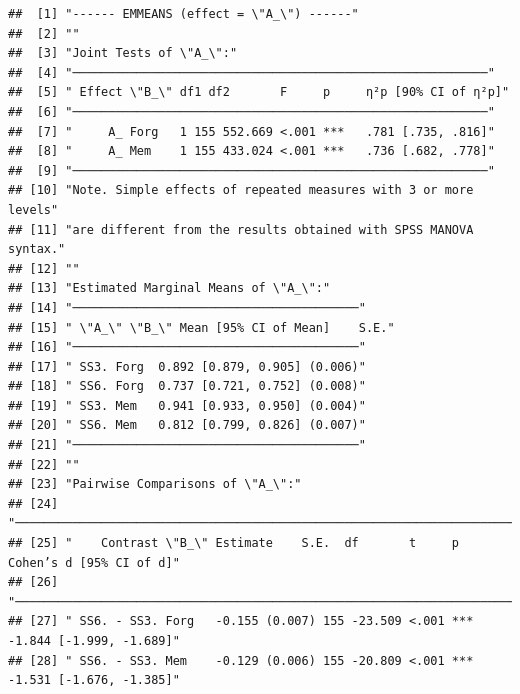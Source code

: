 \documentclass[
  man]{apa6}
\begin{document}
\begin{verbatim}
##  [1] "------ EMMEANS (effect = \"A_\") ------"                                           
##  [2] ""                                                                                  
##  [3] "Joint Tests of \"A_\":"                                                            
##  [4] "──────────────────────────────────────────────────────────"                        
##  [5] " Effect \"B_\" df1 df2       F     p     η²p [90% CI of η²p]"                      
##  [6] "──────────────────────────────────────────────────────────"                        
##  [7] "     A_ Forg   1 155 552.669 <.001 ***   .781 [.735, .816]"                        
##  [8] "     A_ Mem    1 155 433.024 <.001 ***   .736 [.682, .778]"                        
##  [9] "──────────────────────────────────────────────────────────"                        
## [10] "Note. Simple effects of repeated measures with 3 or more levels"                   
## [11] "are different from the results obtained with SPSS MANOVA syntax."                  
## [12] ""                                                                                  
## [13] "Estimated Marginal Means of \"A_\":"                                               
## [14] "────────────────────────────────────────"                                          
## [15] " \"A_\" \"B_\" Mean [95% CI of Mean]    S.E."                                      
## [16] "────────────────────────────────────────"                                          
## [17] " SS3. Forg  0.892 [0.879, 0.905] (0.006)"                                          
## [18] " SS6. Forg  0.737 [0.721, 0.752] (0.008)"                                          
## [19] " SS3. Mem   0.941 [0.933, 0.950] (0.004)"                                          
## [20] " SS6. Mem   0.812 [0.799, 0.826] (0.007)"                                          
## [21] "────────────────────────────────────────"                                          
## [22] ""                                                                                  
## [23] "Pairwise Comparisons of \"A_\":"                                                   
## [24] "────────────────────────────────────────────────────────────────────────────────"  
## [25] "    Contrast \"B_\" Estimate    S.E.  df       t     p     Cohen’s d [95% CI of d]"
## [26] "────────────────────────────────────────────────────────────────────────────────"  
## [27] " SS6. - SS3. Forg   -0.155 (0.007) 155 -23.509 <.001 *** -1.844 [-1.999, -1.689]"  
## [28] " SS6. - SS3. Mem    -0.129 (0.006) 155 -20.809 <.001 *** -1.531 [-1.676, -1.385]"  

\end{verbatim}
\end{document}
